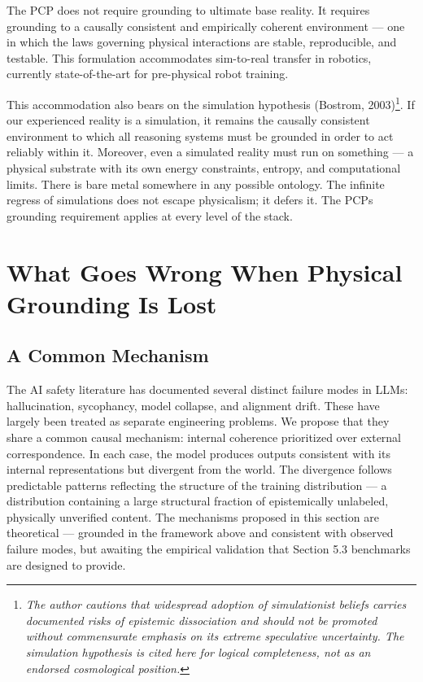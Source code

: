 \documentclass[12pt]{article}
\begin{document}
The PCP does not require grounding to ultimate base reality. It requires
grounding to a causally consistent and empirically coherent environment
--- one in which the laws governing physical interactions are stable,
reproducible, and testable. This formulation accommodates sim-to-real
transfer in robotics, currently state-of-the-art for pre-physical robot
training.

This accommodation also bears on the simulation hypothesis (Bostrom,
2003)\footnote{\emph{The author cautions that widespread adoption of
  simulationist beliefs carries documented risks of epistemic
  dissociation and should not be promoted without commensurate emphasis
  on its extreme speculative uncertainty. The simulation hypothesis is
  cited here for logical completeness, not as an endorsed cosmological
  position.}}. If our experienced reality is a simulation, it remains
the causally consistent environment to which all reasoning systems must
be grounded in order to act reliably within it. Moreover, even a
simulated reality must run on something --- a physical substrate with
its own energy constraints, entropy, and computational limits. There is
bare metal somewhere in any possible ontology. The infinite regress of
simulations does not escape physicalism; it defers it. The
PCP\textquotesingle s grounding requirement applies at every level of
the stack.

\section{What Goes Wrong When Physical Grounding Is Lost}\label{what-goes-wrong-when-physical-grounding-is-lost}

\subsection{A Common Mechanism}\label{a-common-mechanism}

The AI safety literature has documented several distinct failure modes
in LLMs: hallucination, sycophancy, model collapse, and alignment drift.
These have largely been treated as separate engineering problems. We
propose that they share a common causal mechanism: internal coherence
prioritized over external correspondence. In each case, the model
produces outputs consistent with its internal representations but
divergent from the world. The divergence follows predictable patterns
reflecting the structure of the training distribution --- a distribution
containing a large structural fraction of epistemically unlabeled,
physically unverified content. The mechanisms proposed in this section
are theoretical --- grounded in the framework above and consistent with
observed failure modes, but awaiting the empirical validation that
Section 5.3 benchmarks are designed to provide.
\end{document}
